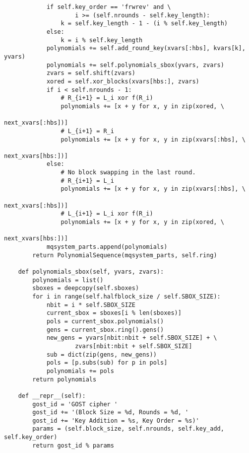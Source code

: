\begin{lstlisting}
            if self.key_order == 'frwrev' and \
                    i >= (self.nrounds - self.key_length):
                k = self.key_length - 1 - (i % self.key_length)
            else:
                k = i % self.key_length
            polynomials += self.add_round_key(xvars[:hbs], kvars[k], yvars)
            polynomials += self.polynomials_sbox(yvars, zvars)
            zvars = self.shift(zvars)
            xored = self.xor_blocks(xvars[hbs:], zvars)
            if i < self.nrounds - 1:
                # R_{i+1} = L_i xor f(R_i)
                polynomials += [x + y for x, y in zip(xored, \
                                                        next_xvars[:hbs])]
                # L_{i+1} = R_i
                polynomials += [x + y for x, y in zip(xvars[:hbs], \
                                                        next_xvars[hbs:])]
            else:
                # No block swapping in the last round.
                # R_{i+1} = L_i
                polynomials += [x + y for x, y in zip(xvars[:hbs], \
                                                        next_xvars[:hbs])]
                # L_{i+1} = L_i xor f(R_i)
                polynomials += [x + y for x, y in zip(xored, \
                                                        next_xvars[hbs:])]
            mqsystem_parts.append(polynomials)
        return PolynomialSequence(mqsystem_parts, self.ring)

    def polynomials_sbox(self, yvars, zvars):
        polynomials = list()
        sboxes = deepcopy(self.sboxes)
        for i in range(self.halfblock_size / self.SBOX_SIZE):
            nbit = i * self.SBOX_SIZE
            current_sbox = sboxes[i % len(sboxes)]
            pols = current_sbox.polynomials()
            gens = current_sbox.ring().gens()
            new_gens = yvars[nbit:nbit + self.SBOX_SIZE] + \
                    zvars[nbit:nbit + self.SBOX_SIZE]
            sub = dict(zip(gens, new_gens))
            pols = [p.subs(sub) for p in pols]
            polynomials += pols
        return polynomials

    def __repr__(self):
        gost_id = 'GOST cipher '
        gost_id += '(Block Size = %d, Rounds = %d, '
        gost_id += 'Key Addition = %s, Key Order = %s)'
        params = (self.block_size, self.nrounds, self.key_add, self.key_order)
        return gost_id % params


\end{lstlisting}

